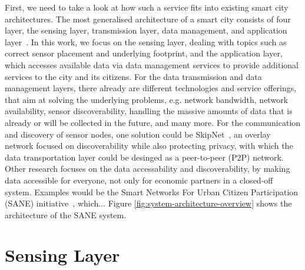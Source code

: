 First, we need to take a look at how such a service fits into existing smart city architectures. The most generalised architecture of a smart city consists of four layer, the sensing layer, transmission layer, data management, and application layer~\cite{silva2018towards}. In this work, we focus on the sensing layer, dealing with topics such as correct sensor placement and underlying footprint, and the application layer, which accesses available data via data management services to provide additional services to the city and its citizens. For the data transmission and data management layers, there already are different technologies and service offerings, that aim at solving the underlying problems, e.g. network bandwidth, network availability, sensor discoverability, handling the massive amounts of data that is already or will be collected in the future, and many more. For the communication and discovery of sensor nodes, one solution could be SkipNet~\cite{harvey2002skipnet}, an overlay network focused on discoverability while also protecting privacy, with which the data transportation layer could be desinged as a peer-to-peer (P2P) network. Other research focuses on the data accessability and discoverability, by making data accessible for everyone, not only for economic partners in a closed-off system. Examples would be the Smart Networks For Urban Citizen Participation (SANE) initiative~\cite{bornholdt2019sane}, which... Figure \ref{fig:system-architecture-overview} shows the architecture of the SANE system.

\section{Sensing Layer}


